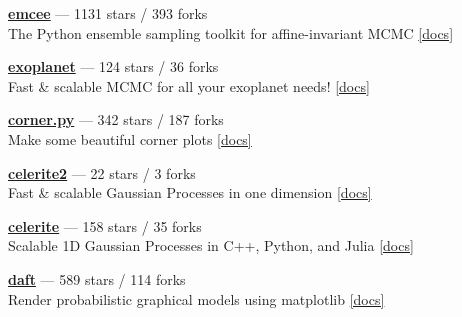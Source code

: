 \item \href{https://github.com/dfm/emcee}{{\bf emcee}} --- 1131 stars / 393 forks \\
The Python ensemble sampling toolkit for affine-invariant MCMC \href{https://emcee.readthedocs.io}{[docs]}

\item \href{https://github.com/exoplanet-dev/exoplanet}{{\bf exoplanet}} --- 124 stars / 36 forks \\
Fast {\&} scalable MCMC for all your exoplanet needs!  \href{https://docs.exoplanet.codes}{[docs]}

\item \href{https://github.com/dfm/corner.py}{{\bf corner.py}} --- 342 stars / 187 forks \\
Make some beautiful corner plots \href{http://corner.readthedocs.io}{[docs]}

\item \href{https://github.com/exoplanet-dev/celerite2}{{\bf celerite2}} --- 22 stars / 3 forks \\
Fast {\&} scalable Gaussian Processes in one dimension \href{https://celerite2.readthedocs.io}{[docs]}

\item \href{https://github.com/dfm/celerite}{{\bf celerite}} --- 158 stars / 35 forks \\
Scalable 1D Gaussian Processes in C++, Python, and Julia \href{http://celerite.rtfd.io}{[docs]}

\item \href{https://github.com/daft-dev/daft}{{\bf daft}} --- 589 stars / 114 forks \\
Render probabilistic graphical models using matplotlib \href{https://docs.daft-pgm.org}{[docs]}